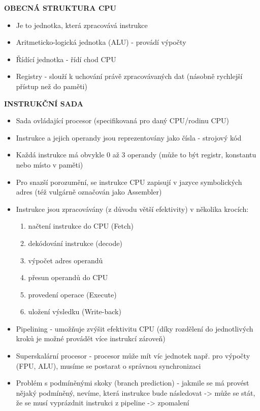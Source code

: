 \documentclass[10pt,a4paper]{article}
\begin{document}
\textbf{OBECNÁ STRUKTURA CPU}
\begin{itemize}
	\item Je to jednotka, která zpracovává instrukce
	\item Aritmeticko-logická jednotka (ALU) - provádí výpočty
	\item Řídící jednotka - řídí chod CPU
	\item Registry - slouží k uchování právě zpracovávaných dat (násobně rychlejší přístup než do paměti)
\end{itemize}

\textbf{INSTRUKČNÍ SADA}
\begin{itemize}
	\item Sada ovládající procesor (specifikovaná pro daný CPU/rodinu CPU)
	\item Instrukce a jejich operandy jsou reprezentovány jako čísla - strojový kód
	\item Každá instrukce má obvykle 0 až 3 operandy (může to být registr, konstantu nebo místo v paměti)
	\item Pro snazší porozumění, se instrukce CPU zapisují v jazyce symbolických adres (též vulgárně označován jako Assembler)
	\item Instrukce jsou zpracovávány (z důvodu větší efektivity) v několika krocích:
	\begin{enumerate}
		\item načtení instrukce do CPU (Fetch)
		\item dekódování instrukce (decode)
		\item výpočet adres operandů
		\item přesun operandů do CPU
		\item provedení operace (Execute)
		\item uložení výsledku (Write-back)
	\end{enumerate}
	\item Pipelining - umožňuje zvýšit efektivitu CPU (díky rozdělení do jednotlivých kroků je možné provádět více instrukcí zároveň)
	\item Superskalární procesor - procesor může mít víc jednotek např. pro výpočty (FPU, ALU), musíme se postarat o správnou synchronizaci
	\item Problém s podmíněnými skoky (branch prediction) - jakmile se má provést nějaký podmíněný, nevíme, která instrukce bude následovat -> může se stát, že se musí vyprázdnit instrukci z pipeline -> zpomalení
\end{itemize}
\end{document}
